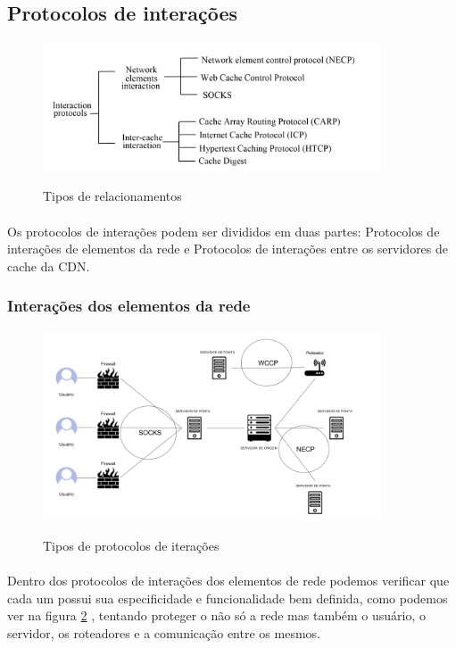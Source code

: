 \subsection{Protocolos de intera\c{c}\~oes}
\label{section:protocolos_interacoes}
\begin{figure}[h]
\caption{Tipos de relacionamentos}
\includegraphics[width=10cm]{Figuras/tipos_relacionamentos.png} 
\label{figura:tipos_relacionamentos}
\end{figure}

\paragraph{} Os protocolos de intera\c{c}\~oes podem ser divididos em duas partes: Protocolos de intera\c{c}\~oes de elementos da rede e Protocolos de intera\c{c}\~oes entre os servidores de cache da CDN. 


\subsubsection{Intera\c{c}\~oes dos elementos da rede}
\begin{figure}[h]
\caption{Tipos de protocolos de itera\c{c}\~oes}
\includegraphics[width=10cm]{Figuras/protocolos_interacao_elementos.png} 
\label{figura:protocolos_interacao_elementos}
\end{figure}

\paragraph{} Dentro dos protocolos de intera\c{c}\~oes dos elementos de rede podemos verificar que cada um possui sua especificidade e funcionalidade bem definida, como podemos ver na figura \ref{figura:protocolos_interacao_elementos} , tentando proteger o n\~ao s\'o a rede mas tamb\'em o usu\'ario, o servidor, os roteadores e a comunica\c{c}\~ao entre os mesmos.


